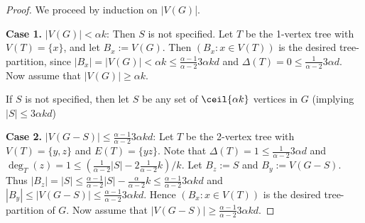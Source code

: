 \begin{proof}
We proceed by induction on $|V(G)$|.

\textbf{Case 1.} $|V(G)| < \alpha  k$: Then $S$ is not specified. Let $T$ be the 1-vertex tree with $V(T)=\{x\}$, and let $B_x:=V(G)$. Then $(B_x:x\in V(T))$ is the desired tree-partition, since $|B_x|=|V(G)|<\alpha  k \leq \frac{\alpha-1}{\alpha-2}  3 \alpha    kd$ and $\Delta(T)=0\leq \frac{1}{\alpha-2} 3 \alpha   d$. Now assume that $|V(G)| \geq \alpha  k$. 

If $S$ is not specified, then let $S$ be any set of $\ceil{\alpha k}$ vertices in $G$ (implying $|S|\leq 3 \alpha  kd$)

\textbf{Case 2.} $|V(G-S)|\leq \frac{\alpha-1}{\alpha-2}  3 \alpha   kd$: Let $T$ be the 2-vertex tree with $V(T)=\{y,z\}$ and $E(T)=\{yz\}$. Note that $\Delta(T)=1\leq \frac{1}{\alpha-2} 3 \alpha    d$ and $\deg_T(z)=1\leq (\frac{1}{\alpha-2}|S|-2 \frac{1}{\alpha-2} k)/k$. Let $B_z:=S$ and $B_y:=V(G-S)$. Thus $|B_z|=|S|\leq \frac{\alpha-1}{\alpha-2} |S|- \frac{\alpha}{\alpha-2} k\leq \frac{\alpha-1}{\alpha-2}  3 \alpha   kd$ and $|B_y|\leq |V(G-S)|\leq \frac{\alpha-1}{\alpha-2}  3 \alpha   kd$. Hence $(B_x:x\in V(T))$ is the desired tree-partition of $G$. Now assume that $|V(G-S)|\geq \frac{\alpha-1}{\alpha-2}  3 \alpha   kd$.


\end{proof}
